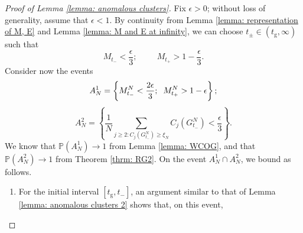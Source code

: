 \begin{proof}[Proof of Lemma \ref{lemma: anomalous clusters}] Fix $\epsilon >0$; without loss of generality, assume that $\epsilon<1.$ By continuity from Lemma \ref{lemma: representation of M, E} and Lemma \ref{lemma: M and E at infinity}, we can choose $t_\pm \in (t_\mathrm{g}, \infty)$ such that \begin{equation}
    M_{t_-}<\frac{\epsilon}{3};\hspace{1cm}M_{t_+}>1-\frac{\epsilon}{3}.
\end{equation} Consider now the events \begin{equation}
    A^1_N=\left\{M^N_{t_-}<\frac{2\epsilon}{3}; \hspace{0.2cm} M^N_{t_+}>1-\epsilon \right\};
\end{equation} \begin{equation}
    A^2_N=\left\{\frac{1}{N}\sum_{j\geq 2: C_j(G^N_{t_-})\geq \xi_N} C_j(G^N_{t_-})<\frac{\epsilon}{3} \right\}.
\end{equation} We know that $\mathbb{P}(A^1_N)\rightarrow 1 $ from Lemma \ref{lemma: WCOG}, and that $\mathbb{P}(A^2_N)\rightarrow 1$ from Theorem \ref{thrm: RG2}. On the event $A^1_N \cap A^2_N$, we bound as follows. 
\begin{enumerate}[label=\roman{*}).]
    \item For the initial interval $[t_\mathrm{g}, t_-]$, an argument similar to that of Lemma \ref{lemma: anomalous clusters 2} shows that, on this event,
 

\end{enumerate}
\end{proof}
